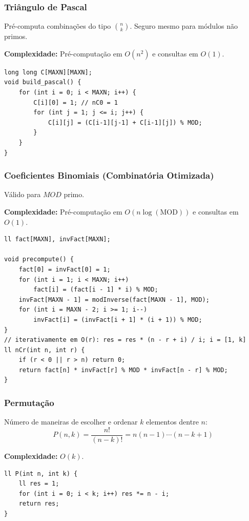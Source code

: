 \subsubsection{Triângulo de Pascal}

Pré-computa combinações do tipo $\binom{n}{k}$. Seguro mesmo para módulos não primos.

\textbf{Complexidade:} Pré-computação em $O(n^2)$ e consultas em $O(1)$.

\begin{lstlisting}
long long C[MAXN][MAXN];
void build_pascal() {
    for (int i = 0; i < MAXN; i++) {
        C[i][0] = 1; // nC0 = 1
        for (int j = 1; j <= i; j++) {
            C[i][j] = (C[i-1][j-1] + C[i-1][j]) % MOD;
        }
    }
}
\end{lstlisting}


\subsubsection{Coeficientes Binomiais (Combinatória Otimizada)}

Válido para $MOD$ primo.

\textbf{Complexidade:} Pré-computação em $O(n \log(\text{MOD}))$ e consultas em $O(1)$.

\begin{lstlisting}
ll fact[MAXN], invFact[MAXN];

void precompute() {
    fact[0] = invFact[0] = 1;
    for (int i = 1; i < MAXN; i++) 
        fact[i] = (fact[i - 1] * i) % MOD;
    invFact[MAXN - 1] = modInverse(fact[MAXN - 1], MOD);
    for (int i = MAXN - 2; i >= 1; i--) 
        invFact[i] = (invFact[i + 1] * (i + 1)) % MOD;
}
// iterativamente em O(r): res = res * (n - r + i) / i; i = [1, k]
ll nCr(int n, int r) {
    if (r < 0 || r > n) return 0;
    return fact[n] * invFact[r] % MOD * invFact[n - r] % MOD;
}
\end{lstlisting}


\subsubsection{Permutação}

Número de maneiras de escolher e ordenar $k$ elementos dentre $n$:
\[
P(n,k)
=
\frac{n!}{(n-k)!}
=
n(n-1)\cdots(n-k+1)
\]

\textbf{Complexidade:} $O(k)$.

\begin{lstlisting}
ll P(int n, int k) {
    ll res = 1;
    for (int i = 0; i < k; i++) res *= n - i;
    return res;
}
\end{lstlisting}


